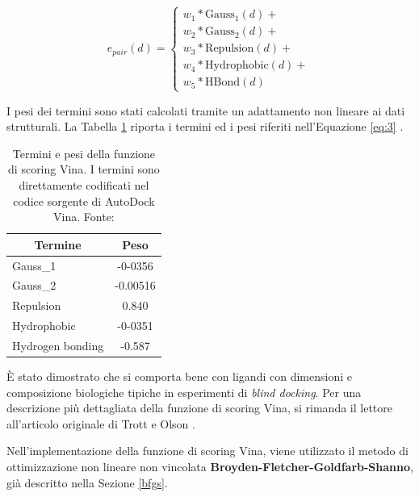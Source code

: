 \begin{equation} \label{eq:3}
    e_{pair}(d) = 
    \begin{cases}
        w_1 * \text{Gauss}_1(d) +\\
        w_2 * \text{Gauss}_2(d) +\\
        w_3 * \text{Repulsion}(d) +\\
        w_4 * \text{Hydrophobic}(d) +\\
        w_5 * \text{HBond}(d)
    \end{cases}
\end{equation} 

I pesi dei termini sono stati calcolati tramite un adattamento non lineare ai dati strutturali. La Tabella \ref{vina_weights} riporta i termini ed i pesi riferiti nell'Equazione \ref{eq:3} \cite{quiroga_vinardo_2016}.

\begin{table}[H] 
\centering
\begin{tabular}{lc}
\toprule
\multicolumn{1}{c}{\textbf{Termine}} & \textbf{Peso} \\ \midrule
Gauss\_1                                                       & -0-0356       \\ \midrule
Gauss\_2                                                       & -0.00516      \\ \midrule
Repulsion                                                      & 0.840         \\ \midrule
Hydrophobic                                                    & -0-0351       \\ \midrule
Hydrogen bonding                                               & -0.587        \\ \bottomrule
\end{tabular}
\caption[Termini e pesi della funzione di scoring Vina.]{Termini e pesi della funzione di scoring Vina. I termini sono direttamente codificati nel codice sorgente di AutoDock Vina. Fonte: \cite{trott_autodock_2009}}
\label{vina_weights}
\end{table}

È stato dimostrato che si comporta bene con ligandi con dimensioni e composizione biologiche tipiche in esperimenti di \textit{blind docking}.
Per una descrizione più dettagliata della funzione di scoring Vina, si rimanda il lettore all'articolo originale di Trott e Olson \cite{trott_autodock_2009, quiroga_vinardo_2016}.

Nell'implementazione della funzione di scoring Vina, viene utilizzato il metodo di ottimizzazione non lineare non vincolata \textbf{Broyden-Fletcher-Goldfarb-Shanno}, già descritto nella Sezione \ref{bfgs}.

